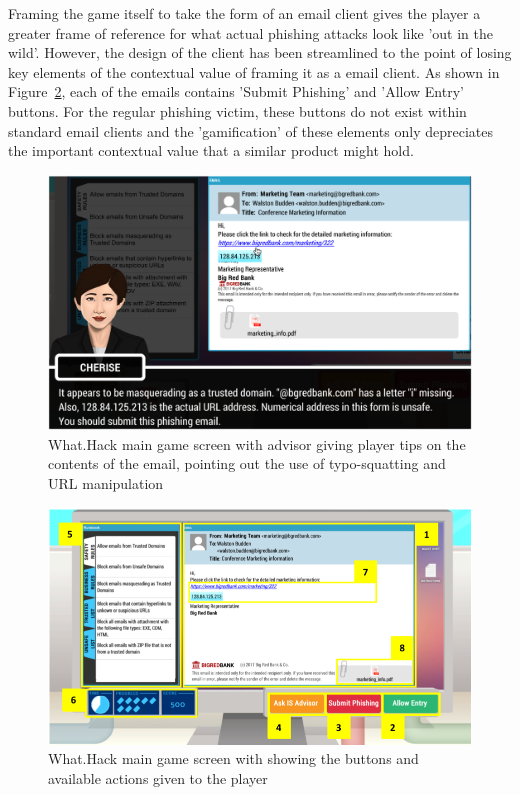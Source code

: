 \documentclass{l4proj}
\begin{document}
Framing the game itself to take the form of an email client gives the player a greater frame of reference for what actual phishing attacks look like 'out in the wild'. However, the design of the client has been streamlined to the point of losing key elements of the contextual value of framing it as a email client. As shown in Figure~\ref{fig:whathack_2}, each of the emails contains 'Submit Phishing' and 'Allow Entry' buttons. For the regular phishing victim, these buttons do not exist within standard email clients and the 'gamification' of these elements only depreciates the important contextual value that a similar product might hold.

\begin{figure}[H]
    \centering
    \includegraphics[width=1\linewidth]{images/whathack_1.png}    
    \caption{What.Hack main game screen with advisor giving player tips on the contents of the email, pointing out the use of typo-squatting and URL manipulation}
    \label{fig:whathack_1} 
\end{figure}

\begin{figure}[H]
    \centering
    \includegraphics[width=1\linewidth]{images/whathack_2.png}    
    \caption{What.Hack main game screen with showing the buttons and available actions given to the player}
    \label{fig:whathack_2} 
\end{figure}
\end{document}
